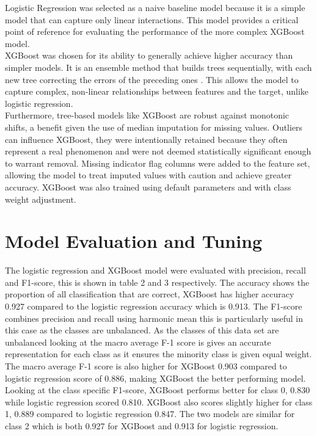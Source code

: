 \documentclass[10pt,twocolumn,letterpaper]{article}
\begin{document}
Logistic Regression was selected as a naive baseline model because it is a simple model that can capture only linear interactions. This model provides a critical point of reference for evaluating the performance of the more complex XGBoost model. \\

XGBoost was chosen for its ability to generally achieve higher accuracy than simpler models. It is an ensemble method that builds trees sequentially, with each new tree correcting the errors of the preceding ones . This allows the model to capture complex, non-linear relationships between features and the target, unlike logistic regression. \\

Furthermore, tree-based models like XGBoost are robust against monotonic shifts, a benefit given the use of median imputation for missing values. Outliers can influence XGBoost, they were intentionally retained because they often represent a real phenomenon and were not deemed statistically significant enough to warrant removal. Missing indicator flag columns were added to the feature set, allowing the model to treat imputed values with caution and achieve greater accuracy. XGBoost was also trained using default parameters and with class weight adjustment. 


\section{Model Evaluation and Tuning}

The logistic regression and XGBoost model were evaluated with precision, recall and F1-score, this is shown in table 2 and 3 respectively. The accuracy shows the proportion of all classification that are correct, XGBoost has higher accuracy 0.927 compared to the logistic regression accuracy which is 0.913. The F1-score combines precision and recall using harmonic mean this is particularly useful in this case as the classes are unbalanced.  As the classes of this data set are unbalanced looking at the macro average F-1 score is gives an accurate representation for each class as it ensures the minority class is given equal weight. The macro average F-1 score is also higher for XGBoost 0.903 compared to logistic regression score of 0.886, making XGBoost the better performing model.  \\

Looking at the class specific F1-score, XGBoost performs better for class 0, 0.830 while logistic regression scored 0.810. XGBoost also scores slightly higher for class 1, 0.889 compared to logistic regression 0.847. The two models are similar for class 2 which is both 0.927 for XGBoost and 0.913 for logistic regression.  
 
\end{document}
